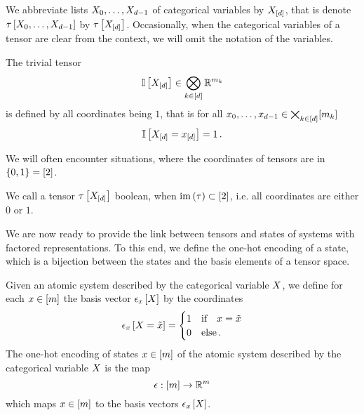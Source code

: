 We abbreviate lists $X_{0},\ldots,X_{d-1}$ of categorical variables by $X_{[d]}$, that is denote $\tau\left[X_{0},\ldots,X_{d-1}\right]$ by $\tau\left[X_{[d]}\right]$.
Occasionally, when the categorical variables of a tensor are clear from the context, we will omit the notation of the variables. %

\begin{example}\label{exa:trivialTensor}
	The trivial tensor
	\begin{align*}
		 \mathbb{I}\left[X_{[d]}\right] \in \bigotimes_{k\in[d]} \mathbb{R}^{m_{k}}
	\end{align*}
	is defined by all coordinates being $1$, that is for all $x_{0},\ldots,x_{d-1}\in\bigtimes_{k\in[d]}[m_{k}]$
	\begin{align*}
		\mathbb{I}\left[X_{[d]}=x_{[d]}\right] = 1 \, .
	\end{align*}
\end{example}


We will often encounter situations, where the coordinates of tensors are in $\{0,1\}=[2]$.

\begin{definition}\label{def:booleanTensor}
	We call a tensor $\tau\left[X_{[d]}\right]$ boolean, when $\mathrm{im}\left(\tau\right)\subset[2]$, i.e. all coordinates are either $0$ or $1$.
\end{definition}


We are now ready to provide the link between tensors and states of systems with factored representations.
To this end, we define the one-hot encoding of a state, which is a bijection between the states and the basis elements of a tensor space.

\begin{definition}
	Given an atomic system described by the categorical variable $X$, we define for each $x\in[m]$ the basis vector $\epsilon_{x}\left[X\right]$ by the coordinates
	\begin{align}
		\epsilon_{x}\left[X=\tilde{x}\right] = \begin{cases}
			1 & \text{if}\quad x=\tilde{x} \\
			0 & \text{else} \, .
		\end{cases}
	\end{align}
	The one-hot encoding of states $x\in[m]$ of the atomic system described by the categorical variable $X$ is the map
		\[ \epsilon: [m] \rightarrow \mathbb{R}^m \]
	which maps $x \in [m]$ to the basis vectors $\epsilon_{x}\left[X\right]$.
\end{definition}


